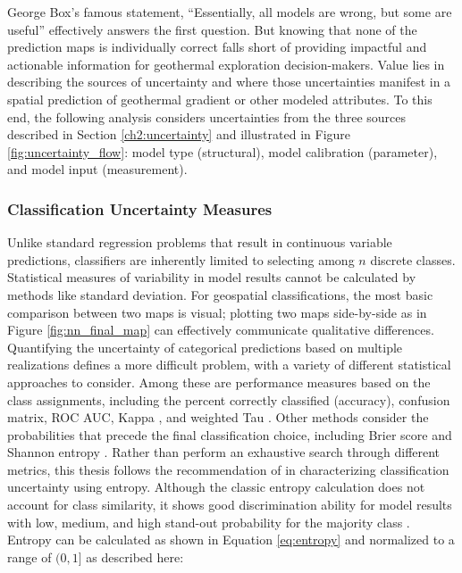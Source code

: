 George Box's famous statement, “Essentially, all models are wrong, but some are useful” \citep{box_empirical_1987} effectively answers the first question. But knowing that none of the prediction maps is individually correct falls short of providing impactful and actionable information for geothermal exploration decision-makers. Value lies in describing the sources of uncertainty and where those uncertainties manifest in a spatial prediction of geothermal gradient or other modeled attributes. To this end, the following analysis considers uncertainties from the three sources described in Section \ref{ch2:uncertainty} and illustrated in Figure \ref{fig:uncertainty_flow}: model type (structural), model calibration (parameter), and model input (measurement).

\subsubsection{Classification Uncertainty Measures}

Unlike standard regression problems that result in continuous variable predictions, classifiers are inherently limited to selecting among $n$ discrete classes. Statistical measures of variability in model results cannot be calculated by methods like standard deviation. For geospatial classifications, the most basic comparison between two maps is visual; plotting two maps side-by-side as in Figure \ref{fig:nn_final_map} can effectively communicate qualitative differences. Quantifying the uncertainty of categorical predictions based on multiple realizations defines a more difficult problem, with a variety of different statistical approaches to consider. Among these are performance measures based on the class assignments, including the percent correctly classified (accuracy), confusion matrix, ROC AUC, Kappa \citep{cohen_coefficient_1960}, and weighted Tau \citep{ma_tau_1995}. Other methods consider the probabilities that precede the final classification choice, including Brier score \citep{brier_verification_1950} and Shannon entropy \citep{shannon_mathematical_1948}. Rather than perform an exhaustive search through different metrics, this thesis follows the recommendation of \citep{beaudette_accuracy_2020} in characterizing classification uncertainty using entropy. Although the classic entropy calculation does not account for class similarity, it shows good discrimination ability for model results with low, medium, and high stand-out probability for the majority class \citep{beaudette_accuracy_2020}. Entropy can be calculated as shown in Equation \ref{eq:entropy} and normalized to a range of $(0, 1]$ as described here:

